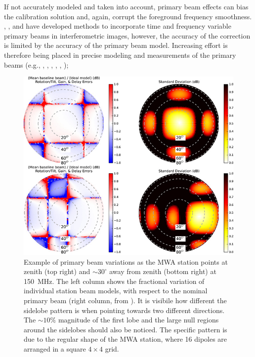 \begin{itemize}
If not accurately modeled and taken into account, primary beam effects can bias the calibration solution and, again, corrupt the foreground frequency smoothness.  \cite{bhatnagar08}, \cite{bernardi11}, \cite{sullivan12} and \cite{tasse13} have developed methods to incorporate time and frequency variable primary beams in interferometric images, however, the accuracy of the correction is limited by the accuracy of the primary beam model. Increasing effort is therefore being placed in precise modeling and measurements of the  primary beams (e.g., \cite{pupillo15}, \cite{trott16}, \cite{deleraacedo17}, \cite{trott17a}, \cite{jacobs17}, \cite{deleraacedo18});
\begin{figure}[]
\begin{center}
\includegraphics[width=1.\textwidth]{Bernardi/mwa_beams_err}
\end{center}
\caption{Example of primary beam variations as the MWA station points at zenith (top right) and $\sim 30^\circ$ away from zenith (bottom right) at 150~MHz. The left column shows the fractional variation of individual station beam models, with respect to the nominal primary beam (right column, from \cite{neben16}). It is visibile how different the sidelobe pattern is when pointing towards two different directions. The $\sim 10\%$ magnitude of the first lobe and the large null regions around the sidelobes should also be noticed. The specific pattern is due to the regular shape of the MWA station, where 16 dipoles are arranged in a square $4 \times 4$ grid.}
\label{fig:fig3}
\end{figure}



\end{itemize}
